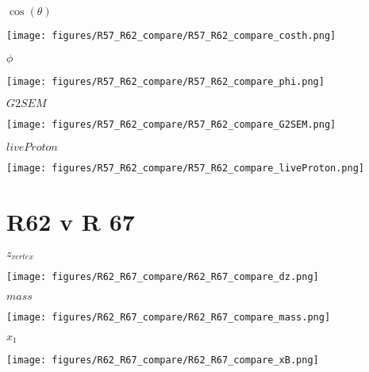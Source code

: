 \documentclass{beamer}
\begin{document}
\begin{frame}{$\cos(\theta)$}
	\begin{center}
		\texttt{[image: figures/R57\_R62\_compare/R57\_R62\_compare\_costh.png]}
	\end{center}
\end{frame}

\begin{frame}{$\phi$}
	\begin{center}
		\texttt{[image: figures/R57\_R62\_compare/R57\_R62\_compare\_phi.png]}
	\end{center}
\end{frame}

\begin{frame}{$G2SEM$}
	\begin{center}
		\texttt{[image: figures/R57\_R62\_compare/R57\_R62\_compare\_G2SEM.png]}
	\end{center}
\end{frame}

\begin{frame}{$liveProton$}
	\begin{center}
		\texttt{[image: figures/R57\_R62\_compare/R57\_R62\_compare\_liveProton.png]}
	\end{center}
\end{frame}

\section{R62 v R 67}

\begin{frame}{$z_{vertex}$}
	\begin{center}
		\texttt{[image: figures/R62\_R67\_compare/R62\_R67\_compare\_dz.png]}
	\end{center}
\end{frame}

\begin{frame}{$mass$}
	\begin{center}
		\texttt{[image: figures/R62\_R67\_compare/R62\_R67\_compare\_mass.png]}
	\end{center}
\end{frame}

\begin{frame}{$x_1$}
	\begin{center}
		\texttt{[image: figures/R62\_R67\_compare/R62\_R67\_compare\_xB.png]}
	\end{center}
\end{frame}
\end{document}
